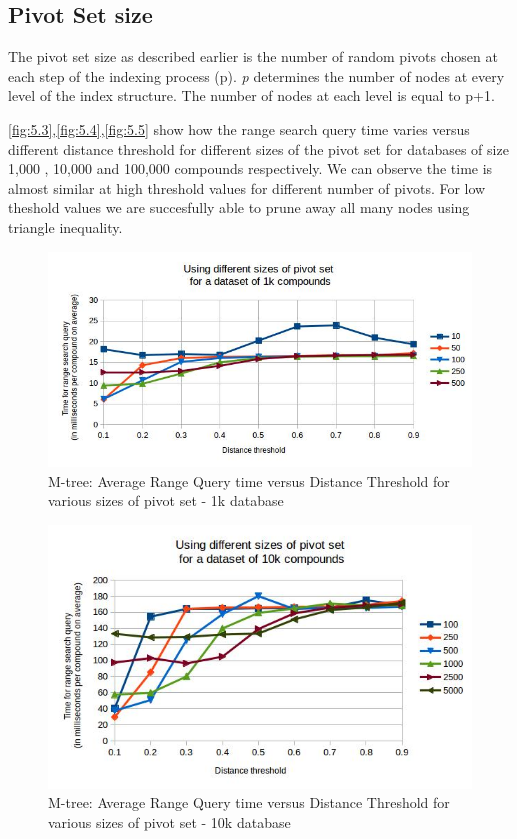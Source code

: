 \subsection{Pivot Set size}
The pivot set size as described earlier is the number of random pivots chosen at each step of the indexing process (p). \textit{p} determines the number of nodes at every level of the index structure. The number of nodes at each level is equal to p+1.

\autoref{fig:5.3},\autoref{fig:5.4},\autoref{fig:5.5}  show how the range search query time varies versus different distance threshold for different sizes of the pivot set for databases of size 1,000 , 10,000 and 100,000 compounds respectively. We can observe the time is almost similar at high threshold values for different number of pivots. For low theshold values we are succesfully able to prune away all many nodes using triangle inequality. 


\begin{figure}[ht!]	
\centering
\includegraphics[width=1 \columnwidth]{img/image2.jpg}
\caption{M-tree: Average Range Query time versus Distance Threshold for various sizes of pivot set - 1k database}
\label{fig:5.3}
\end{figure}


\begin{figure}[ht!]	
\centering
\includegraphics[width=1 \columnwidth]{img/image3.jpg}
\caption{M-tree: Average Range Query time versus Distance Threshold for various sizes of pivot set - 10k database}
\label{fig:5.4}
\end{figure}


